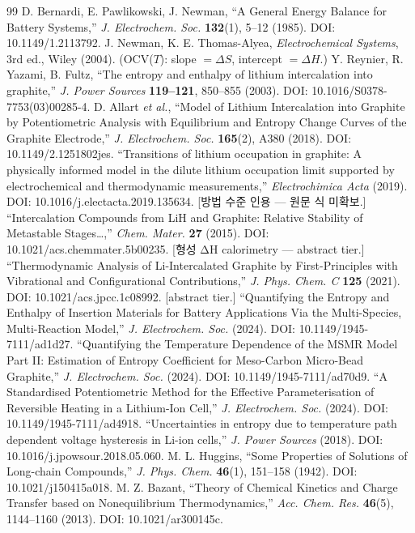 \documentclass[11pt,a4paper]{article}
\begin{document}
\begin{thebibliography}{99}
 D. Bernardi, E. Pawlikowski, J. Newman, ``A General Energy Balance for Battery Systems,'' \emph{J. Electrochem. Soc.} \textbf{132}(1), 5--12 (1985). DOI: 10.1149/1.2113792.
 J. Newman, K. E. Thomas-Alyea, \emph{Electrochemical Systems}, 3rd ed., Wiley (2004). (OCV($T$): slope $=\Delta S$, intercept $=\Delta H$.)
 Y. Reynier, R. Yazami, B. Fultz, ``The entropy and enthalpy of lithium intercalation into graphite,'' \emph{J. Power Sources} \textbf{119--121}, 850--855 (2003). DOI: 10.1016/S0378-7753(03)00285-4.
 D. Allart \emph{et al.}, ``Model of Lithium Intercalation into Graphite by Potentiometric Analysis with Equilibrium and Entropy Change Curves of the Graphite Electrode,'' \emph{J. Electrochem. Soc.} \textbf{165}(2), A380 (2018). DOI: 10.1149/2.1251802jes.
 ``Transitions of lithium occupation in graphite: A physically informed model in the dilute lithium occupation limit supported by electrochemical and thermodynamic measurements,'' \emph{Electrochimica Acta} (2019). DOI: 10.1016/j.electacta.2019.135634. [방법 수준 인용 — 원문 식 미확보.]
 ``Intercalation Compounds from LiH and Graphite: Relative Stability of Metastable Stages\ldots,'' \emph{Chem. Mater.} \textbf{27} (2015). DOI: 10.1021/acs.chemmater.5b00235. [형성 ΔH calorimetry — abstract tier.]
 ``Thermodynamic Analysis of Li-Intercalated Graphite by First-Principles with Vibrational and Configurational Contributions,'' \emph{J. Phys. Chem. C} \textbf{125} (2021). DOI: 10.1021/acs.jpcc.1c08992. [abstract tier.]
 ``Quantifying the Entropy and Enthalpy of Insertion Materials for Battery Applications Via the Multi-Species, Multi-Reaction Model,'' \emph{J. Electrochem. Soc.} (2024). DOI: 10.1149/1945-7111/ad1d27.
 ``Quantifying the Temperature Dependence of the MSMR Model Part II: Estimation of Entropy Coefficient for Meso-Carbon Micro-Bead Graphite,'' \emph{J. Electrochem. Soc.} (2024). DOI: 10.1149/1945-7111/ad70d9.
 ``A Standardised Potentiometric Method for the Effective Parameterisation of Reversible Heating in a Lithium-Ion Cell,'' \emph{J. Electrochem. Soc.} (2024). DOI: 10.1149/1945-7111/ad4918.
 ``Uncertainties in entropy due to temperature path dependent voltage hysteresis in Li-ion cells,'' \emph{J. Power Sources} (2018). DOI: 10.1016/j.jpowsour.2018.05.060.
 M. L. Huggins, ``Some Properties of Solutions of Long-chain Compounds,'' \emph{J. Phys. Chem.} \textbf{46}(1), 151--158 (1942). DOI: 10.1021/j150415a018.
 M. Z. Bazant, ``Theory of Chemical Kinetics and Charge Transfer based on Nonequilibrium Thermodynamics,'' \emph{Acc. Chem. Res.} \textbf{46}(5), 1144--1160 (2013). DOI: 10.1021/ar300145c.
\end{thebibliography}
\end{document}
